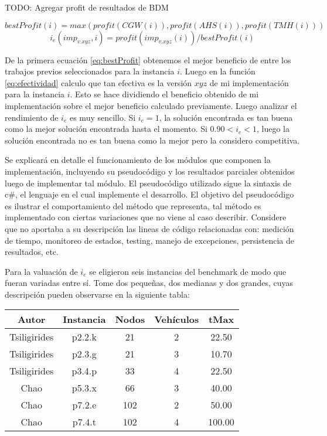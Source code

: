 TODO: Agregar profit de resultados de BDM

\begin{equation}
bestProfit(i) = max(profit(CGW(i)), profit(AHS(i)), profit(TMH(i))) \label{eq:bestProfit}
\end{equation}
\begin{equation}
i_e(imp_{v.xyz},i) = profit(imp_{v.xyz}(i)) / bestProfit(i) \label{eq:efectividad}
\end{equation}

\bigskip

De la primera ecuación \eqref{eq:bestProfit} obtenemos el mejor beneficio de entre los trabajos previos seleccionados para la instancia $i$. Luego en la función \eqref{eq:efectividad} calculo que tan efectiva es la versión $xyz$ de mi implementación para la instancia $i$. Esto se hace dividiendo el beneficio obtenido de mi implementación sobre el mejor beneficio calculado previamente. Luego analizar el rendimiento de $i_e$ es muy sencillo. Si $i_e = 1$, la solución encontrada es tan buena como la mejor solución encontrada hasta el momento. Si $0.90 < i_e < 1$, luego la solución encontrada no es tan buena como la mejor pero la considero competitiva.

\bigskip

Se explicará en detalle el funcionamiento de los módulos que componen la implementación, incluyendo su pseudocódigo y los resultados parciales obtenidos luego de implementar tal módulo. El pseudocódigo utilizado sigue la sintaxis de c\#, el lenguaje en el cual implemente el desarrollo. El objetivo del pseudocódigo es ilustrar el comportamiento del método que representa, tal método es implementado con ciertas variaciones que no viene al caso describir. Considere que no aportaba a su descripción las lineas de código relacionadas con: medición de tiempo, monitoreo de estados, testing, manejo de excepciones, persistencia de resultados, etc. 


\bigskip

Para la valuación de $i_e$ se eligieron seis instancias del benchmark \cite{IntancesChaoTsiligirides} de modo que fueran variadas entre sí. Tome dos pequeñas, dos medianas y dos grandes, cuyas descripción pueden observarse en la siguiente tabla:

\begin{center}
\begin{tabular}{ |c|c|c|c|c| } 
 \hline
Autor & Instancia & Nodos & Vehículos & tMax \\
\hline
Tsiligirides & p2.2.k & 21 & 2 & 22.50 \\
Tsiligirides & p2.3.g & 21 & 3 & 10.70 \\
Tsiligirides & p3.4.p & 33 & 4 & 22.50 \\
Chao & p5.3.x & 66 & 3 & 40.00 \\
Chao & p7.2.e & 102 & 2 & 50.00 \\
Chao & p7.4.t & 102 & 4 & 100.00 \\
 \hline
\end{tabular}
\end{center}


